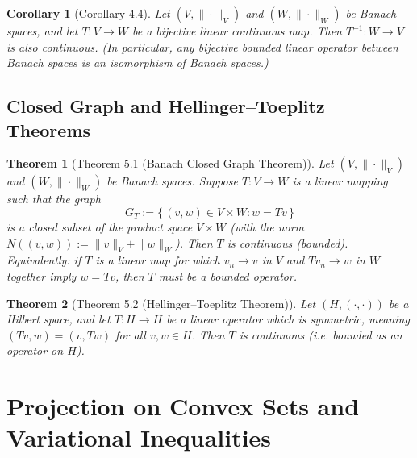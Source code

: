 \documentclass{article}
\theoremstyle{plain}
\newtheorem*{theorem*}{Theorem}
\newtheorem*{corollary*}{Corollary}
\begin{document}
\begin{corollary*}[Corollary 4.4]
Let $(V,\|\cdot\|_V)$ and $(W,\|\cdot\|_W)$ be Banach spaces, and let $T: V \to W$ be a bijective linear continuous map. Then $T^{-1}: W \to V$ is also continuous.  (In particular, any bijective bounded linear operator between Banach spaces is an isomorphism of Banach spaces.)
\end{corollary*}

\subsection*{Closed Graph and Hellinger–Toeplitz Theorems}
\begin{theorem*}[Theorem 5.1 (Banach Closed Graph Theorem)]
Let $(V,\|\cdot\|_V)$ and $(W,\|\cdot\|_W)$ be Banach spaces. Suppose $T: V \to W$ is a linear mapping such that the graph 
\[ 
G_T := \{\,(v,w) \in V \times W : w = T v\,\} 
\] 
is a closed subset of the product space $V \times W$ (with the norm $N((v,w)) := \|v\|_V + \|w\|_W$). Then $T$ is continuous (bounded). Equivalently: if $T$ is a linear map for which $v_n \to v$ in $V$ and $T v_n \to w$ in $W$ together imply $w = T v$, then $T$ must be a bounded operator.
\end{theorem*}

\begin{theorem*}[Theorem 5.2 (Hellinger–Toeplitz Theorem)]
Let $(H,(\cdot,\cdot))$ be a Hilbert space, and let $T: H \to H$ be a linear operator which is \emph{symmetric}, meaning $(T v, w) = (v, T w)$ for all $v,w \in H$. Then $T$ is continuous (i.e. bounded as an operator on $H$). 
\end{theorem*}

\section{Projection on Convex Sets and Variational Inequalities}
\end{document}
